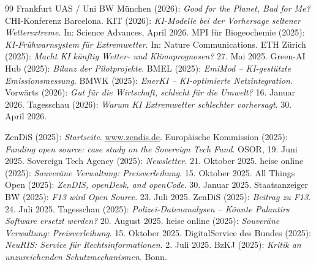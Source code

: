 \documentclass[12pt,a4paper]{article}
\begin{document}
\begin{thebibliography}{99}
		 Frankfurt UAS / Uni BW München (2026): \emph{Good for the Planet, Bad for Me?} CHI-Konferenz Barcelona.
		 KIT (2026): \emph{KI-Modelle bei der Vorhersage seltener Wetterextreme}. In: Science Advances, April 2026.
		 MPI für Biogeochemie (2025): \emph{KI-Frühwarnsystem für Extremwetter}. In: Nature Communications.
		 ETH Zürich (2025): \emph{Macht KI künftig Wetter- und Klimaprognosen?} 27. Mai 2025.
		 Green-AI Hub (2025): \emph{Bilanz der Pilotprojekte}.
		 BMEL (2025): \emph{EmiMod – KI-gestützte Emissionsmessung}.
		 BMWK (2025): \emph{EnerKI – KI-optimierte Netzintegration}.
		 Vorwärts (2026): \emph{Gut für die Wirtschaft, schlecht für die Umwelt?} 16. Januar 2026.
		 Tagesschau (2026): \emph{Warum KI Extremwetter schlechter vorhersagt}. 30. April 2026.
		
		 ZenDiS (2025): \emph{Startseite}. \url{www.zendis.de}.
		 Europäische Kommission (2025): \emph{Funding open source: case study on the Sovereign Tech Fund}. OSOR, 19. Juni 2025.
		 Sovereign Tech Agency (2025): \emph{Newsletter}. 21. Oktober 2025.
		 heise online (2025): \emph{Souveräne Verwaltung: Preisverleihung}. 15. Oktober 2025.
		 All Things Open (2025): \emph{ZenDIS, openDesk, and openCode}. 30. Januar 2025.
		 Staatsanzeiger BW (2025): \emph{F13 wird Open Source}. 23. Juli 2025.
		 ZenDiS (2025): \emph{Beitrag zu F13}. 24. Juli 2025.
		 Tagesschau (2025): \emph{Polizei-Datenanalysen – Könnte Palantirs Software ersetzt werden?} 20. August 2025.
		 heise online (2025): \emph{Souveräne Verwaltung: Preisverleihung}. 15. Oktober 2025.
		 DigitalService des Bundes (2025): \emph{NeuRIS: Service für Rechtsinformationen}. 2. Juli 2025.
		 BzKJ (2025): \emph{Kritik an unzureichenden Schutzmechanismen}. Bonn.
		
	\end{thebibliography}
	
\end{document}
